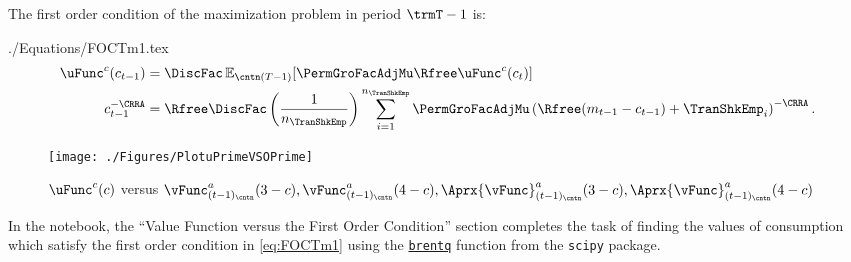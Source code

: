 \documentclass[SolvingMicroDSOPs]{subfiles}
\begin{document}
The first order condition of the maximization problem in period $\trmT-1$ is:
\begin{verbatimwrite}{./Equations/FOCTm1.tex}
  \begin{equation}\begin{gathered}\begin{aligned}
        \uFunc^{{c}}({c}_{\prdT-1})       & = \DiscFac \Ex_{\cntn(T-1)} [\PermGroFacAdjMu\Rfree \uFunc^{{c}}({c}_{\prdT})]  %
        \\      {c}_{\prdT-1}^{-\CRRA}   & = \Rfree \DiscFac \left(\frac{1}{n_{\TranShkEmp}}\right) \sum_{i=1}^{n_{\TranShkEmp}} \PermGroFacAdjMu\left(\Rfree ({m}_{\prdT-1}-{c}_{\prdT-1}) + \TranShkEmp_{i}\right)^{-\CRRA} \label{eq:FOCTm1}.
      \end{aligned}\end{gathered}\end{equation}
\end{verbatimwrite}
\unskip
{}
\hypertarget{PlotuPrimeVSOPrime}{}
\begin{figure}
  \centerline{\texttt{[image: ./Figures/PlotuPrimeVSOPrime]}}
  \caption{$\uFunc^{{c}}(c)$ versus $\vFunc_{({\prdT-1})_\cntn}^{{a}}(3-c), \vFunc_{({\prdT-1})_\cntn}^{{a}}(4-c), \Aprx{\vFunc}_{({\prdT-1})_\cntn}^{{a}}(3-c), \Aprx{\vFunc}_{({\prdT-1})_\cntn}^{{a}}(4-c)$}
  \label{fig:PlotuPrimeVSOPrime}
\end{figure}

In the notebook, the ``Value Function versus the First Order Condition'' section completes the task of finding the values of consumption which satisfy the first order condition in \eqref{eq:FOCTm1} using the \href{https://docs.scipy.org/doc/scipy/reference/generated/scipy.optimize.brentq.html}{\texttt{brentq}} function from the \texttt{scipy} package. %
\end{document}
